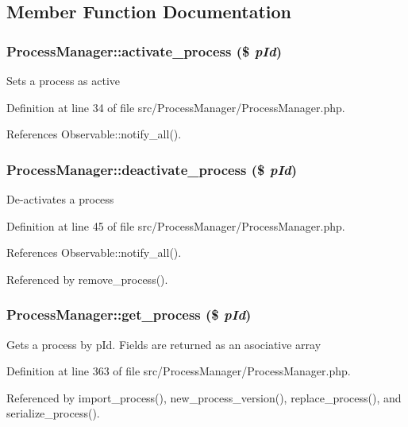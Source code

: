 \subsection{Member Function Documentation}
\subsubsection{\setlength{\rightskip}{0pt plus 5cm}Process\-Manager::activate\_\-process (\$ {\em p\-Id})}\label{classProcessManager_a1}


Sets a process as active 

Definition at line 34 of file src/Process\-Manager/Process\-Manager.php.

References Observable::notify\_\-all().
\subsubsection{\setlength{\rightskip}{0pt plus 5cm}Process\-Manager::deactivate\_\-process (\$ {\em p\-Id})}\label{classProcessManager_a2}


De-activates a process 

Definition at line 45 of file src/Process\-Manager/Process\-Manager.php.

References Observable::notify\_\-all().

Referenced by remove\_\-process().
\subsubsection{\setlength{\rightskip}{0pt plus 5cm}Process\-Manager::get\_\-process (\$ {\em p\-Id})}\label{classProcessManager_a8}


Gets a process by p\-Id. Fields are returned as an asociative array 

Definition at line 363 of file src/Process\-Manager/Process\-Manager.php.

Referenced by import\_\-process(), new\_\-process\_\-version(), replace\_\-process(), and serialize\_\-process().
